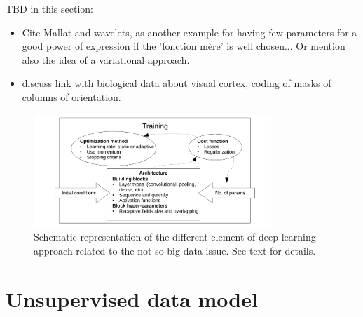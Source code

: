 \documentclass[twocolumn]{article}
\begin{document}


TBD in this section:
\begin{itemize}
\item Cite Mallat and wavelets, as another example for having few parameters for a good power of expression if the 'fonction mère' is well chosen... Or mention also the idea of a variational approach. 
\item discuss link with biological data about visual cortex, coding of masks of columns of orientation. 
\end{itemize}



\begin{figure}
\label{diagram}
\centering
\includegraphics[width=0.8\textwidth]{img/diagram}
\caption{Schematic representation of the different element of deep-learning approach related to the not-so-big data issue. See text for details.}
\end{figure}







\section{Unsupervised data model}
\end{document}
